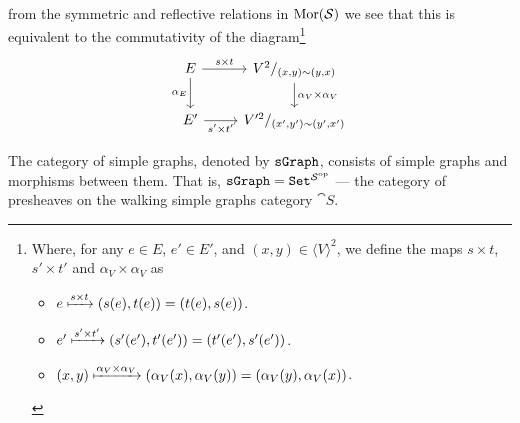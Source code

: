 \begin{definition}
\begin{itemize}
\[\begin{tikzcd}
        \end{tikzcd}
      \]
      from the symmetric and reflective relations in \(\operatorname{Mor}(\mathcal S)\) we see
      that this is equivalent to the commutativity of the diagram\footnote{
        Where, for any \(e \in E\), \(e' \in E'\), and \((x, y) \in \langle V
        \rangle^2\), we define the maps \(s \times t\), \(s' \times t'\) and
        \(\alpha_V \times \alpha_V\) as
        \begin{itemize}
          \setlength\itemsep{0.0em}
          \item \(e \xmapsto{s \times t} (s(e), t(e)) = (t(e), s(e))\).
          \item \(e' \xmapsto{s' \times t'} (s'(e'), t'(e')) = (t'(e'),
            s'(e'))\).
          \item \((x, y) \xmapsto{\alpha_V \times \alpha_V} (\alpha_V(x),
            \alpha_V(y)) = (\alpha_V(y), \alpha_V(x))\).
        \end{itemize}
      }
      \[
        \begin{tikzcd}
          E \ar[r, "s \times t"]
          \ar[d, swap, "\alpha_E"]
          &V^2/_{(x, y) \sim (y, x)}
          \ar[d, "\alpha_V \times \alpha_V"]
          \\
          E' \ar[r, swap, "s' \times t'"] &V'^2/_{(x', y') \sim (y', x')}
        \end{tikzcd}
      \]
  \end{itemize}
\end{definition}

\begin{definition}
  The category of simple graphs, denoted by \({\texttt{sGraph}}\), consists of
  simple graphs and morphisms between them. That is, \({\texttt{sGraph}} = {\texttt{Set}}^{\mathcal
  S^{\mathrm{op}}}\) --- the category of presheaves on the walking simple graphs category
  \(\cat S\).
\end{definition}
